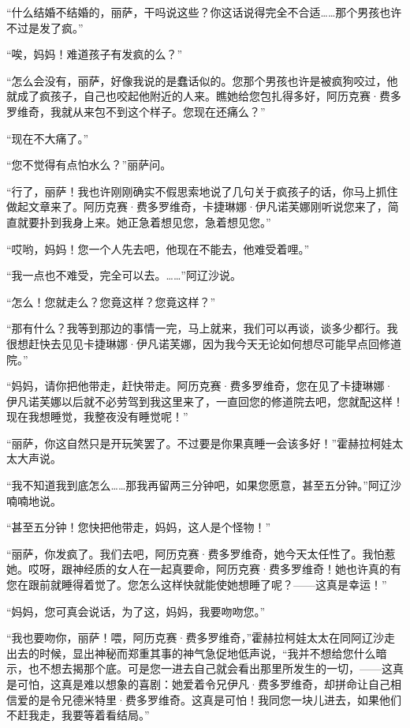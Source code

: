 \par “什么结婚不结婚的，丽萨，干吗说这些？你这话说得完全不合适……那个男孩也许不过是发了疯。”
\par “唉，妈妈！难道孩子有发疯的么？”
\par “怎么会没有，丽萨，好像我说的是蠢话似的。您那个男孩也许是被疯狗咬过，他就成了疯孩子，自己也咬起他附近的人来。瞧她给您包扎得多好，阿历克赛·费多罗维奇，我就从来包不到这个样子。您现在还痛么？”
\par “现在不大痛了。”
\par “您不觉得有点怕水么？”丽萨问。
\par “行了，丽萨！我也许刚刚确实不假思索地说了几句关于疯孩子的话，你马上抓住做起文章来了。阿历克赛·费多罗维奇，卡捷琳娜·伊凡诺芙娜刚听说您来了，简直就要扑到我身上来。她正急着想见您，急着想见您。”
\par “哎哟，妈妈！您一个人先去吧，他现在不能去，他难受着哩。”
\par “我一点也不难受，完全可以去。……”阿辽沙说。
\par “怎么！您就走么？您竟这样？您竟这样？”
\par “那有什么？我等到那边的事情一完，马上就来，我们可以再谈，谈多少都行。我很想赶快去见见卡捷琳娜·伊凡诺芙娜，因为我今天无论如何想尽可能早点回修道院。”
\par “妈妈，请你把他带走，赶快带走。阿历克赛·费多罗维奇，您在见了卡捷琳娜·伊凡诺芙娜以后就不必劳驾到我这里来了，一直回您的修道院去吧，您就配这样！现在我想睡觉，我整夜没有睡觉呢！”
\par “丽萨，你这自然只是开玩笑罢了。不过要是你果真睡一会该多好！”霍赫拉柯娃太太大声说。
\par “我不知道我到底怎么……那我再留两三分钟吧，如果您愿意，甚至五分钟。”阿辽沙喃喃地说。
\par “甚至五分钟！您快把他带走，妈妈，这人是个怪物！”
\par “丽萨，你发疯了。我们去吧，阿历克赛·费多罗维奇，她今天太任性了。我怕惹她。哎呀，跟神经质的女人在一起真要命，阿历克赛·费多罗维奇！她也许真的有您在跟前就睡得着觉了。您怎么这样快就能使她想睡了呢？——这真是幸运！”
\par “妈妈，您可真会说话，为了这，妈妈，我要吻吻您。”
\par “我也要吻你，丽萨！喂，阿历克赛·费多罗维奇，”霍赫拉柯娃太太在同阿辽沙走出去的时候，显出神秘而郑重其事的神气急促地低声说，“我并不想给您什么暗示，也不想去揭那个底。可是您一进去自己就会看出那里所发生的一切，——这真是可怕，这真是难以想象的喜剧：她爱着令兄伊凡·费多罗维奇，却拼命让自己相信爱的是令兄德米特里·费多罗维奇。这真是可怕！我同您一块儿进去，如果他们不赶我走，我要等着看结局。”
